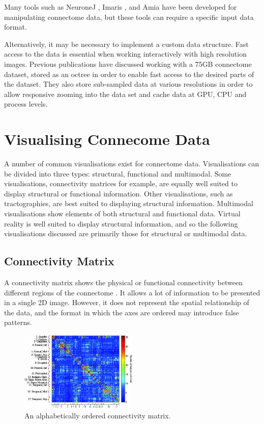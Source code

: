 \documentclass[MSc,paper=a4,pagesize=auto]{icldt}
\begin{document}
Many tools such as NeuroneJ \cite{NeuronJ2014}, Imaris \cite{Imaris2014}, and Amia \cite{Amira2014} have been developed for manipulating connectome data, but these tools can require a specific input data format. 

Alternatively, it may be necessary to implement a custom data structure. Fast access to the data is essential when working interactively with high resolution images. Previous publications \cite{Jeong2010} have discussed working with a 75GB connectome dataset, stored as an octree in order to enable fast access to the desired parts of the dataset. They also store sub-sampled data at various resolutions in order to allow responsive zooming into the data set and cache data at GPU, CPU and process levels. 

\section{Visualising Connecome Data}
A number of common visualisations exist for connectome data. Visualisations can be divided into three types: structural, functional and multimodal. Some visualisations, connectivity matrices for example, are equally well suited to display structural or functional information. Other visualisations, such as tractographies, are best suited to displaying structural information. Multimodal visualisations show elements of both structural and functional data. Virtual reality is well suited to display structural information, and so the following visualisations discussed are primarily those for structural or multimodal data.

\subsection{Connectivity Matrix}
A connectivity matrix shows the physical or functional connectivity between different regions of the connectome \cite{Wang2011}. It allows a lot of information to be presented in a single 2D image. However, it does not represent the spatial relationship of the data, and the format in which the axes are ordered may introduce false patterns. 

\begin{figure}[htbp!]
    \centering
    \includegraphics[width=0.5\textwidth]{resources/connectivity_matrix}
    \caption{An alphabetically ordered connectivity matrix. \cite{Wang2011}}
    \label{fig:connectivity_matrix}
\end{figure}
\end{document}
